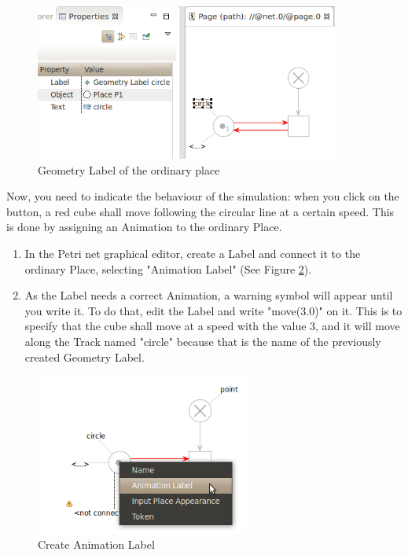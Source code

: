 \begin{figure}[htp]
\begin{center}
  \includegraphics[width=10.0cm]{image/tutorial/Tutorial_08.png}
  \caption{Geometry Label of the ordinary place}
  \label{fig:tut08}
\end{center}
\end{figure}

\newpage
Now, you need to indicate the behaviour of the simulation: when you click on the button, a red cube shall move following the 
circular line at a certain speed. This is done by assigning an Animation  to the ordinary Place.
\begin{enumerate} 
  \item In the Petri net graphical editor, create a Label and connect it to the ordinary Place, selecting "Animation Label"
  (See Figure \ref{fig:tut09}).
  \item As the Label needs a correct Animation, a warning symbol will appear until you write it. To do that, edit the Label 
  and write "move(3.0)" on it. This is to specify that the cube shall move at a speed with the value 3, and it will move along 
  the Track named "circle" because that is the name of the previously created Geometry Label.
\end{enumerate}

\begin{figure}[htp]
\begin{center}
  \includegraphics[width=7.0cm]{image/tutorial/Tutorial_09.png}
  \caption{Create Animation Label}
  \label{fig:tut09}
\end{center}
\end{figure}

